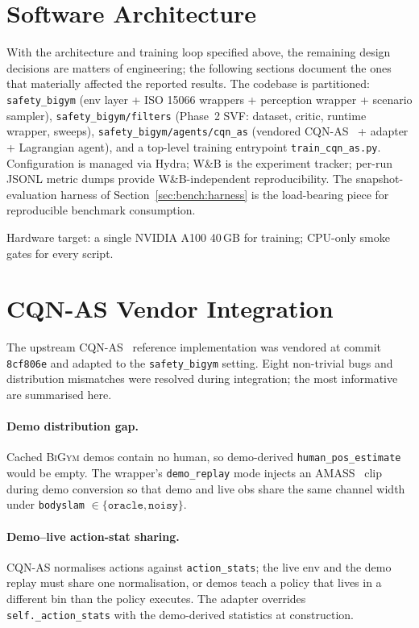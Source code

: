 \documentclass[11pt,a4paper]{report}
\newcommand{\bigym}{\textsc{BiGym}}
\newcommand{\sbigym}{\texttt{safety\_bigym}}
\newcommand{\cqnas}{CQN-AS}
\begin{document}
\section{Software Architecture}
\label{sec:impl:arch}

With the architecture and training loop specified above, the
remaining design decisions are matters of engineering; the following
sections document the ones that materially affected the reported
results. The codebase is partitioned: \sbigym{} (env layer + ISO 15066
wrappers + perception wrapper + scenario sampler),
\texttt{safety\_bigym/filters} (Phase~2 SVF: dataset, critic,
runtime wrapper, sweeps),
\texttt{safety\_bigym/agents/cqn\_as} (vendored
\cqnas{}~\cite{seo2024cqnas} + adapter + Lagrangian agent), and a
top-level training entrypoint \texttt{train\_cqn\_as.py}.
Configuration is managed via Hydra; W\&B is the experiment tracker;
per-run JSONL metric dumps provide W\&B-independent reproducibility.
The snapshot-evaluation harness of Section~\ref{sec:bench:harness}
is the load-bearing piece for reproducible benchmark consumption.

Hardware target: a single NVIDIA A100 40\,GB for training;
CPU-only smoke gates for every script.

\section{\cqnas{} Vendor Integration}
\label{sec:impl:integration}

The upstream \cqnas{}~\cite{seo2024cqnas} reference implementation
was vendored at commit \texttt{8cf806e} and adapted to the
\sbigym{} setting. Eight non-trivial bugs and distribution
mismatches were resolved during integration; the most informative
are summarised here.

\paragraph{Demo distribution gap.}
Cached \bigym{} demos contain no human, so demo-derived
\texttt{human\_pos\_estimate} would be empty. The wrapper's
\texttt{demo\_replay} mode injects an
AMASS~\cite{mahmood2019amass} clip during demo conversion so that
demo and live obs share the same channel width under
\texttt{bodyslam} $\in \{\texttt{oracle}, \texttt{noisy}\}$.

\paragraph{Demo--live action-stat sharing.}
\cqnas{} normalises actions against \texttt{action\_stats}; the
live env and the demo replay must share one normalisation, or
demos teach a policy that lives in a different bin than the policy
executes. The adapter overrides \texttt{self.\_action\_stats} with
the demo-derived statistics at construction.
\end{document}
